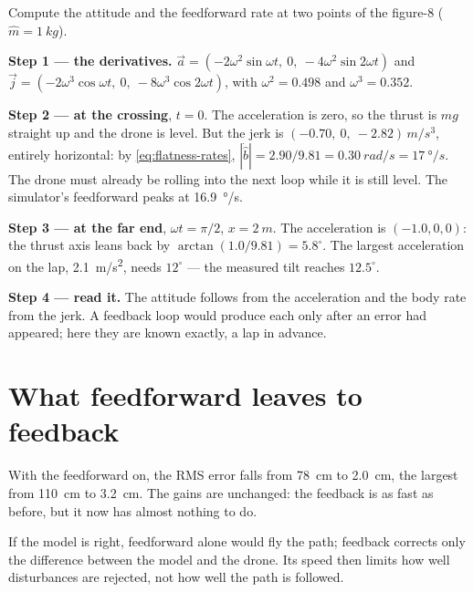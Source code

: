 \begin{example}
\label{ex:flatness-numbers}
Compute the attitude and the feedforward rate at two points of the figure-8 ($\hat m = \SI{1}{kg}$).

\textbf{Step 1 — the derivatives.} $\vec a = (-2\omega^2\sin\omega t,\ 0,\ -4\omega^2\sin2\omega t)$ and $\vec j = (-2\omega^3\cos\omega t,\ 0,\ -8\omega^3\cos2\omega t)$, with $\omega^2 = 0.498$ and $\omega^3 = 0.352$.

\textbf{Step 2 — at the crossing}, $t = 0$. The acceleration is zero, so the thrust is $mg$ straight up and the drone is level. But the jerk is $(-0.70,\ 0,\ -2.82)\,\si{m/s^3}$, entirely horizontal: by \cref{eq:flatness-rates}, $|\dot{\hat b}| = 2.90/9.81 = \SI{0.30}{rad/s} = \SI{17}{\degree/s}$. The drone must already be rolling into the next loop while it is still level. The simulator's feedforward peaks at \SI{16.9}{\degree/s}.

\textbf{Step 3 — at the far end}, $\omega t = \pi/2$, $x = \SI{2}{m}$. The acceleration is $(-1.0, 0, 0)$: the thrust axis leans back by $\arctan(1.0/9.81) = 5.8^\circ$. The largest acceleration on the lap, \SI{2.1}{m/s^2}, needs $12^\circ$ — the measured tilt reaches $12.5^\circ$.

\textbf{Step 4 — read it.} The attitude follows from the acceleration and the body rate from the jerk. A feedback loop would produce each only after an error had appeared; here they are known exactly, a lap in advance.
\end{example}

\section{What feedforward leaves to feedback}

With the feedforward on, the RMS error falls from \SI{78}{cm} to \SI{2.0}{cm}, the largest from \SI{110}{cm} to \SI{3.2}{cm}. The gains are unchanged: the feedback is as fast as before, but it now has almost nothing to do.

\begin{keyidea}
If the model is right, feedforward alone would fly the path; feedback corrects only the difference between the model and the drone. Its speed then limits how well disturbances are rejected, not how well the path is followed.
\end{keyidea}

